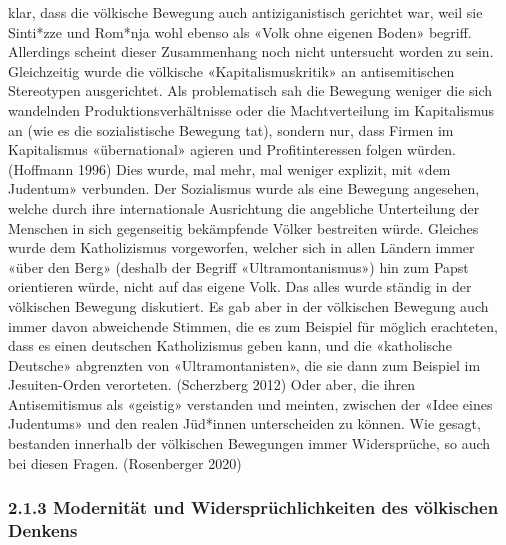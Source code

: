 \documentclass[a4paper,
fontsize=11pt,
oneside,
numbers=noperiodatend,
parskip=half-,
bibliography=totoc,
final
]{scrartcl}
\begin{document}
\begin{enumerate}
{    klar, dass die völkische Bewegung auch antiziganistisch gerichtet
    war, weil sie Sinti*zze und Rom*nja wohl ebenso als «Volk ohne
    eigenen Boden» begriff. Allerdings scheint dieser Zusammenhang noch
    nicht untersucht worden zu sein.} Gleichzeitig wurde die völkische
  «Kapitalismuskritik» an antisemitischen Stereotypen ausgerichtet. Als
  problematisch sah die Bewegung weniger die sich wandelnden
  Produktionsverhältnisse oder die Machtverteilung im Kapitalismus an
  (wie es die sozialistische Bewegung tat), sondern nur, dass Firmen im
  Kapitalismus «übernational» agieren und Profitinteressen folgen
  würden. (Hoffmann 1996) Dies wurde, mal mehr, mal weniger explizit,
  mit «dem Judentum» verbunden. Der Sozialismus wurde als eine Bewegung
  angesehen, welche durch ihre internationale Ausrichtung die angebliche
  Unterteilung der Menschen in sich gegenseitig bekämpfende Völker
  bestreiten würde. Gleiches wurde dem Katholizismus vorgeworfen,
  welcher sich in allen Ländern immer «über den Berg» (deshalb der
  Begriff «Ultramontanismus») hin zum Papst orientieren würde, nicht auf
  das eigene Volk. Das alles wurde ständig in der völkischen Bewegung
  diskutiert. Es gab aber in der völkischen Bewegung auch immer davon
  abweichende Stimmen, die es zum Beispiel für möglich erachteten, dass
  es einen deutschen Katholizismus geben kann, und die «katholische
  Deutsche» abgrenzten von «Ultramontanisten», die sie dann zum Beispiel
  im Jesuiten-Orden verorteten. (Scherzberg 2012) Oder aber, die ihren
  Antisemitismus als «geistig» verstanden und meinten, zwischen der
  «Idee eines Judentums» und den realen Jüd*innen unterscheiden zu
  können. Wie gesagt, bestanden innerhalb der völkischen Bewegungen
  immer Widersprüche, so auch bei diesen Fragen. (Rosenberger 2020)
\end{enumerate}

\hypertarget{modernituxe4t-und-widerspruxfcchlichkeiten-des-vuxf6lkischen-denkens}{%
\subsubsection{2.1.3 Modernität und Widersprüchlichkeiten des völkischen
Denkens}\label{modernituxe4t-und-widerspruxfcchlichkeiten-des-vuxf6lkischen-denkens}}
\end{document}
